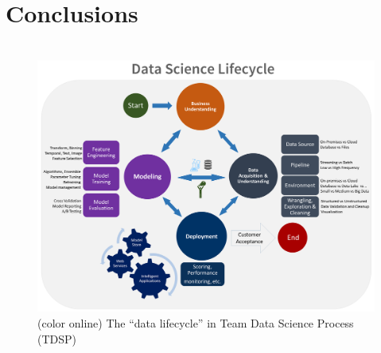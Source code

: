 \documentclass[12pt,letterpaper]{article}
\begin{document}
\section{Conclusions}
\tab 


\pagebreak
\section*{}


\begin{figure}[h!]
  \centering
    \includegraphics[width=1.0\linewidth]{../img/TDSP_Data_Science_Lifecycle.png}
    \caption{(color online) The ``data lifecycle'' in Team Data Science Process (TDSP)}
    \label{fig:tdsp}
  \end{figure}



\clearpage
\section*{}

\center{}
\end{document}
